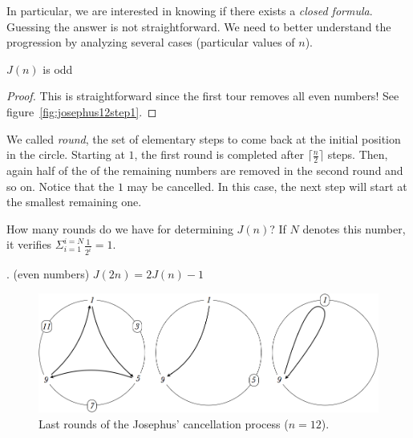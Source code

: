 In particular, we are interested in knowing if there exists a \textit{closed formula}.
Guessing the answer is not straightforward. 
We need to better understand the progression by analyzing several cases (particular values of $n$).
\medskip

\begin{prop}
$J(n)$ is odd
\end{prop}

\begin{proof}
This is straightforward since the first tour removes all even numbers!
See figure~\ref{fig:josephus12step1}. 
\end{proof}
\medskip

\noindent
We called \textit{round}, the set of elementary steps to come back at the initial position in the circle. 
Starting at $1$, the first round is completed after $\lceil \frac{n}{2} \rceil$ steps. 
Then, again half of the of the remaining numbers are removed in the second round and so on.
Notice that the $1$ may be cancelled. In this case, the next step will start at the smallest remaining one.

How many rounds do we have for determining $J(n)$?
If $N$ denotes this number, it verifies
$\Sigma_{i=1}^{i=N} \frac{1}{2^i} = 1$.
\medskip

\begin{prop}. (even numbers)
$J(2n) = 2J(n)-1$ 
\end{prop}

\begin{figure}[h]
\begin{center}
        \includegraphics[scale=0.35]{FiguresMaths/josephus12LastSteps}
        \caption{Last rounds of the Josephus' cancellation process ($n=12$).}
        \label{fig:josephus12step2}
\end{center}
\end{figure}

